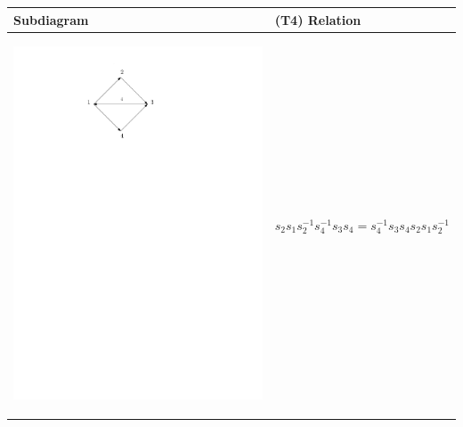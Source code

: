 \documentclass[11pt]{amsart}
\theoremstyle{definition}
\begin{document}
\begin{table} \label{table2}
\begin{tabular}{| p{3.5cm} | p{7cm} |}
\hline
Subdiagram & (T4) Relation \\ \hline
\begin{center}\includegraphics[scale = .30]{Diagram1.pdf}\end{center} & $s_{2}s_{1}s_{2}^{-1}s_{4}^{-1}s_{3}s_{4} = s_{4}^{-1}s_{3}s_{4}s_{2}s_{1}s_{2}^{-1}$ \\ \hline


\end{tabular}
\end{table}
\end{document}
